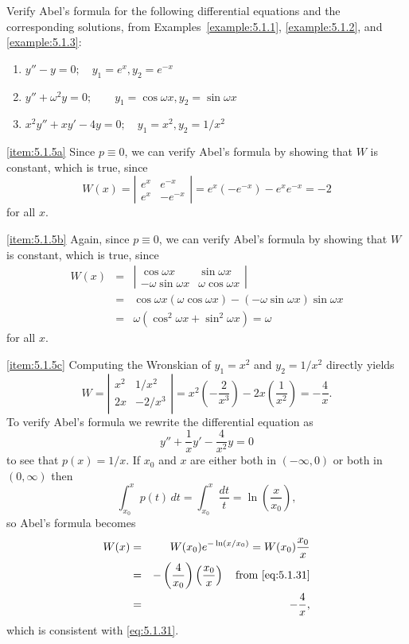 \documentclass{ximera}
\begin{document}
\begin{example}\label{example:5.1.5}
Verify Abel's formula for the following differential equations and the
corresponding solutions, from  Examples~\ref{example:5.1.1},
\ref{example:5.1.2}, and \ref{example:5.1.3}:
\begin{enumerate}
\item\label{item:5.1.5a} %
$y''-y=0;\quad  y_1=e^x,  y_2=e^{-x}$
\item\label{item:5.1.5b}%
$y''+\omega^2y=0;\quad \quad y_1=\cos\omega x, y_2=\sin\omega x$
\item\label{item:5.1.5c}%
$x^2y''+xy'-4y=0;\quad  y_1=x^2, y_2=1/x^2$
\end{enumerate}
\begin{explanation}
\ref{item:5.1.5a} Since $p\equiv0$, we can verify Abel's formula
by showing that $W$ is constant, which is true, since
$$
W(x)=\left| \begin{array}{rr}
e^x & e^{-x} \\
e^x & -e^{-x}
\end{array} \right|=e^x(-e^{-x})-e^xe^{-x}=-2
$$
for all $x$.

\ref{item:5.1.5b} Again, since $p\equiv0$, we can verify Abel's
formula
by showing that $W$ is constant, which is true, since
\begin{eqnarray*}
W(x)&=&\left| \begin{array}{cc}
\cos\omega x & \sin\omega x \\
-\omega\sin\omega x &\omega\cos\omega x
\end{array} \right|\\
&=&\cos\omega x (\omega\cos\omega x)-(-\omega\sin\omega x)\sin\omega
x\\ &=&\omega(\cos^2\omega x+\sin^2\omega x)=\omega
\end{eqnarray*}
for all $x$.

\ref{item:5.1.5c}
Computing the Wronskian of $y_1=x^2$ and
$y_2=1/x^2$ directly yields
\begin{equation}\label{eq:5.1.31}
W=\left| \begin{array}{cc}
x^2 & 1/x^2 \\
2x & -2/x^3
\end{array} \right|=x^2\left(-\frac{2}{x^3}\right)-2x\left(\frac{1}{x^2}\right)
=-\frac{4}{x}.
\end{equation}
To verify Abel's formula we
rewrite the differential  equation as
$$
y''+\frac{1}{x}y'-\frac{4}{x^2}y=0
$$
to see  that $p(x)=1/x$. If $x_0$ and $x$ are either both in
$(-\infty,0)$ or both in $(0,\infty)$ then
$$
\int_{x_0}^x p(t)\,dt=\int_{x_0}^x \frac{dt}{t}=\ln\left(\frac{x}{x_0}
\right),
$$
so Abel's formula becomes
\begin{eqnarray*}
W(x)&=&W(x_0)e^{-\ln(x/x_0)}=W(x_0)\frac{x_0}{x}\\
&=&-\left(\frac{4}{x_0}\right)\left(\frac{x_0}{x}\right)\quad\mbox{from
\eqref{eq:5.1.31}}\\
&=&-\frac{4}{x},
\end{eqnarray*}
which is consistent with \eqref{eq:5.1.31}.
\end{explanation}
\end{example}
\end{document}
